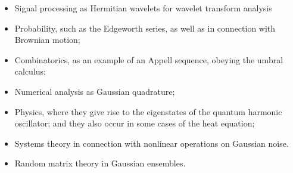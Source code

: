 \documentclass{article}
\renewcommand{\_}{\ifincsname_\else\legacyunderscore\fi}
\begin{document}
    \begin{itemize}
        \item Signal processing as Hermitian wavelets for wavelet transform analysis
        \item Probability, such as the Edgeworth series, as well as in connection with Brownian motion;
        \item Combinatorics, as an example of an Appell sequence, obeying the umbral calculus;
        \item Numerical analysis as Gaussian quadrature;
        \item Physics, where they give rise to the eigenstates of the quantum harmonic oscillator; and they also occur in some cases of the heat equation;
        \item Systems theory in connection with nonlinear operations on Gaussian noise.
        \item Random matrix theory in Gaussian ensembles.
    \end{itemize}

\printbibliography
\end{document}
